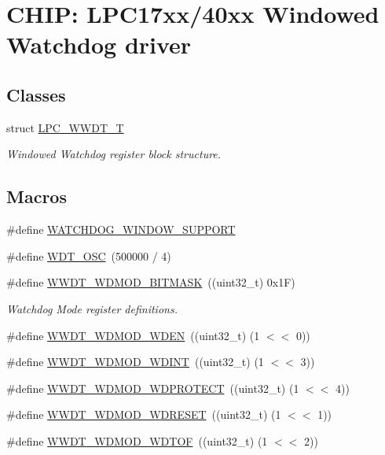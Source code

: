 \hypertarget{group__WWDT__17XX__40XX}{}\section{C\+H\+IP\+: L\+P\+C17xx/40xx Windowed Watchdog driver}
\label{group__WWDT__17XX__40XX}
\subsection*{Classes}
\begin{DoxyCompactItemize}
\item 
struct \hyperlink{structLPC__WWDT__T}{L\+P\+C\+\_\+\+W\+W\+D\+T\+\_\+T}
\begin{DoxyCompactList}\small\item\em Windowed Watchdog register block structure. \end{DoxyCompactList}\end{DoxyCompactItemize}
\subsection*{Macros}
\begin{DoxyCompactItemize}
\item 
\#define \hyperlink{group__WWDT__17XX__40XX_gafd5360b2cfcfe4271a608b6c90bcea5f}{W\+A\+T\+C\+H\+D\+O\+G\+\_\+\+W\+I\+N\+D\+O\+W\+\_\+\+S\+U\+P\+P\+O\+RT}
\item 
\#define \hyperlink{group__WWDT__17XX__40XX_ga628282c7bf5c28d5a859e4915c62b643}{W\+D\+T\+\_\+\+O\+SC}~(500000 / 4)
\item 
\#define \hyperlink{group__WWDT__17XX__40XX_gac9ba0cf06012012875985842cabb5a11}{W\+W\+D\+T\+\_\+\+W\+D\+M\+O\+D\+\_\+\+B\+I\+T\+M\+A\+SK}~((uint32\+\_\+t) 0x1\+F)
\begin{DoxyCompactList}\small\item\em Watchdog Mode register definitions. \end{DoxyCompactList}\item 
\#define \hyperlink{group__WWDT__17XX__40XX_ga9c4d839b554cf8919c76bd613745967f}{W\+W\+D\+T\+\_\+\+W\+D\+M\+O\+D\+\_\+\+W\+D\+EN}~((uint32\+\_\+t) (1 $<$$<$ 0))
\item 
\#define \hyperlink{group__WWDT__17XX__40XX_ga6530623c6535d2c7b65c9b50d320c5f1}{W\+W\+D\+T\+\_\+\+W\+D\+M\+O\+D\+\_\+\+W\+D\+I\+NT}~((uint32\+\_\+t) (1 $<$$<$ 3))
\item 
\#define \hyperlink{group__WWDT__17XX__40XX_gac44132c9f40915e405e3cfedc2599586}{W\+W\+D\+T\+\_\+\+W\+D\+M\+O\+D\+\_\+\+W\+D\+P\+R\+O\+T\+E\+CT}~((uint32\+\_\+t) (1 $<$$<$ 4))
\item 
\#define \hyperlink{group__WWDT__17XX__40XX_gaa6b03ad5df847bc2241c0ea1eefd9431}{W\+W\+D\+T\+\_\+\+W\+D\+M\+O\+D\+\_\+\+W\+D\+R\+E\+S\+ET}~((uint32\+\_\+t) (1 $<$$<$ 1))
\item 
\#define \hyperlink{group__WWDT__17XX__40XX_ga9379872b1e184e20abf74f1abbdd8cb9}{W\+W\+D\+T\+\_\+\+W\+D\+M\+O\+D\+\_\+\+W\+D\+T\+OF}~((uint32\+\_\+t) (1 $<$$<$ 2))
\end{DoxyCompactItemize}
